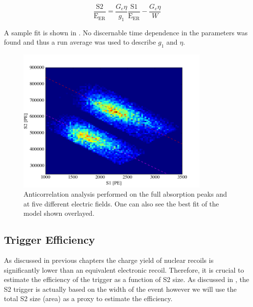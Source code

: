  \begin{equation}
        \label{eqn:nerix_anticorrelation_line}
        \frac{\textrm{S2}}{\textrm{E}_{\textrm{ER}}} = \frac{G_e \eta}{g_1} \frac{\textrm{S1}}{\textrm{E}_{\textrm{ER}}} - \frac{G_e \eta}{W}
\end{equation}

A sample fit is shown in .  No discernable time dependence in the parameters was found and thus a run average was used to describe $g_1$ and $\eta$.

\begin{figure}[t]
        \centering
	\includegraphics[width=0.85\textwidth]{nerix_anticorrelation}
	\caption{Anticorrelation analysis performed on the full absorption peaks \cesium{} and \sodium{} at five different electric fields.  One can also see the best fit of the model shown overlayed.}
	\label{fig:nerix_anticorrelation}
\end{figure}


\subsection{Trigger Efficiency}


As discussed in previous chapters the charge yield of nuclear recoils is significantly lower than an equivalent electronic recoil.  Therefore, it is crucial to estimate the efficiency of the trigger as a function of S2 size.  As discussed in , the S2 trigger is actually based on the width of the event however we will use the total S2 size (area) as a proxy to estimate the efficiency.

